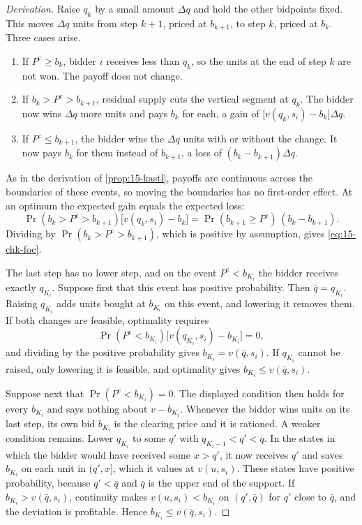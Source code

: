 \begin{proof}[Derivation]
Raise $q_k$ by a small amount $\Delta q$ and hold the other bidpoints fixed. This moves $\Delta q$ units from
step $k+1$, priced at $b_{k+1}$, to step $k$, priced at $b_k$. Three cases arise.
\begin{enumerate}[label=(\roman*)]
\item If $P^{\mathrm c}\ge b_k$, bidder $i$ receives less than $q_k$, so the units at the end of step $k$ are
not won. The payoff does not change.
\item If $b_k>P^{\mathrm c}>b_{k+1}$, residual supply cuts the vertical segment at $q_k$. The bidder now wins
$\Delta q$ more units and pays $b_k$ for each, a gain of $\bigl[v(q_k,s_i)-b_k\bigr]\Delta q$.
\item If $P^{\mathrm c}\le b_{k+1}$, the bidder wins the $\Delta q$ units with or without the change. It now
pays $b_k$ for them instead of $b_{k+1}$, a loss of $(b_k-b_{k+1})\Delta q$.
\end{enumerate}
As in the derivation of \cref{prop:15-kastl}, payoffs are continuous across the boundaries of these events, so
moving the boundaries has no first-order effect. At an optimum the expected gain equals the expected loss:
\[
\Pr(b_k>P^{\mathrm c}>b_{k+1})\bigl[v(q_k,s_i)-b_k\bigr]=\Pr(b_{k+1}\ge P^{\mathrm c})\,(b_k-b_{k+1}) .
\]
Dividing by $\Pr(b_k>P^{\mathrm c}>b_{k+1})$, which is positive by assumption, gives \eqref{eq:15-chk-foc}.

The last step has no lower step, and on the event $P^{\mathrm c}<b_{K_i}$ the bidder receives exactly
$q_{K_i}$. Suppose first that this event has positive probability. Then $\bar q=q_{K_i}$. Raising
$q_{K_i}$ adds units bought at $b_{K_i}$ on this event, and lowering it removes them. If both changes are
feasible, optimality requires
\[
\Pr(P^{\mathrm c}<b_{K_i})\bigl[v(q_{K_i},s_i)-b_{K_i}\bigr]=0 ,
\]
and dividing by the positive probability gives $b_{K_i}=v(\bar q,s_i)$. If $q_{K_i}$ cannot be raised, only
lowering it is feasible, and optimality gives $b_{K_i}\le v(\bar q,s_i)$.

Suppose next that $\Pr(P^{\mathrm c}<b_{K_i})=0$. The displayed condition then holds for every $b_{K_i}$ and
says nothing about $v-b_{K_i}$. Whenever the bidder wins units on its last step, its own bid $b_{K_i}$ is the
clearing price and it is rationed. A weaker condition remains. Lower $q_{K_i}$ to some $q'$ with $q_{K_i-1}<q'<\bar q$. In the
states in which the bidder would have received some $x>q'$, it now receives $q'$ and saves $b_{K_i}$ on
each unit in $(q',x]$, which it values at $v(u,s_i)$. These states have positive probability, because
$q'<\bar q$ and $\bar q$ is the upper end of the support. If $b_{K_i}>v(\bar q,s_i)$, continuity makes $v(u,s_i)<b_{K_i}$ on $(q',\bar q)$
for $q'$ close to $\bar q$, and the deviation is profitable. Hence $b_{K_i}\le v(\bar q,s_i)$.
\end{proof}

